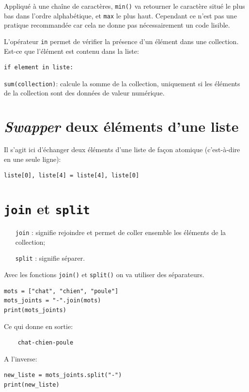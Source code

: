 \documentclass[a4paper,12pt]{book}
\begin{document}
Appliqué à une chaîne de caractères, \texttt{min()} va retourner le caractère situé le plus bas dans l'ordre alphabétique, et \texttt{max} le plus haut. Cependant ce n'est pas une pratique recommandée car cela ne donne pas nécessairement un code lisible.
\medskip

L'opérateur \texttt{in} permet de vérifier la présence d'un élément dans une collection. Est-ce que l'élément est contenu dans la liste:
\begin{lstlisting}
if element in liste:
\end{lstlisting}
\medskip

\texttt{sum(collection)}: calcule la somme de la collection, uniquement si les éléments de la collection sont des données de valeur numérique.
\medskip

\section{\textit{Swapper} deux éléments d'une liste}
Il s'agit ici d'échanger deux éléments d'une liste de façon atomique (c'est-à-dire en une seule ligne):
\begin{lstlisting}
liste[0], liste[4] = liste[4], liste[0]
\end{lstlisting}
\medskip

\section{\texttt{join} et \texttt{split}}
\begin{itemize}
	\item[\texttt{join}]: signifie \og rejoindre\fg{} et permet de coller ensemble les éléments de la collection;
	\item[\texttt{split}]: signifie \og séparer\fg{}. 
\end{itemize}
\medskip

Avec les fonctions \texttt{join()} et \texttt{split()} on va utiliser des séparateurs.
\begin{lstlisting}
mots = ["chat", "chien", "poule"]
mots_joints = "-".join(mots)
print(mots_joints)
\end{lstlisting}
\medskip

Ce qui donne en sortie:
\begin{verbatim}
    chat-chien-poule
\end{verbatim}
\medskip

A l'inverse:
\begin{lstlisting}
new_liste = mots_joints.split("-")
print(new_liste)
\end{lstlisting}
\medskip
\end{document}
